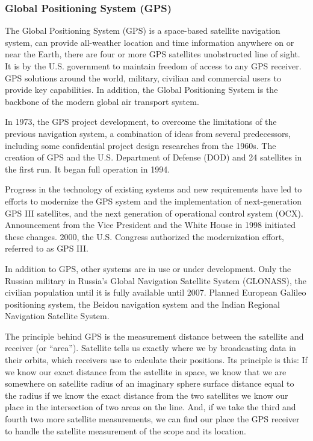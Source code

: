 \documentclass[12pt,a4paper]{article}
\begin{document}
\subsubsection{Global Positioning System (GPS)} %
\label{ssub:global_positioning_system_gps_}
The Global Positioning System (GPS) is a space-based satellite navigation system, can provide all-weather location and time information anywhere on or near the Earth, there are four or more GPS satellites unobstructed line of sight. It is by the U.S. government to maintain freedom of access to any GPS receiver. GPS solutions around the world, military, civilian and commercial users to provide key capabilities. In addition, the Global Positioning System is the backbone of the modern global air transport system. \cite{wiki-gps}

In 1973, the GPS project development, to overcome the limitations of the previous navigation system, a combination of ideas from several predecessors, including some confidential project design researches from the 1960s. \cite{national1995global} The creation of GPS and the U.S. Department of Defense (DOD) and 24 satellites in the first run. It began full operation in 1994.

Progress in the technology of existing systems and new requirements have led to efforts to modernize the GPS system and the implementation of next-generation GPS III satellites, and the next generation of operational control system (OCX). \cite{gpsocx} Announcement from the Vice President and the White House in 1998 initiated these changes. 2000, the U.S. Congress authorized the modernization effort, referred to as GPS III.

In addition to GPS, other systems are in use or under development. Only the Russian military in Russia's Global Navigation Satellite System (GLONASS), the civilian population until it is fully available until 2007. Planned European Galileo positioning system, the Beidou navigation system and the Indian Regional Navigation Satellite System.

The principle behind GPS is the measurement distance between the satellite and receiver (or ``area''). Satellite tells us exactly where we by broadcasting data in their orbits, which receivers use to calculate their positions. Its principle is this: If we know our exact distance from the satellite in space, we know that we are somewhere on satellite radius of an imaginary sphere surface distance equal to the radius if we know the exact distance from the two satellites we know our place in the intersection of two areas on the line. And, if we take the third and fourth two more satellite measurements, we can find our place the GPS receiver to handle the satellite measurement of the scope and its location. \cite{gpsprimer}
\end{document}

